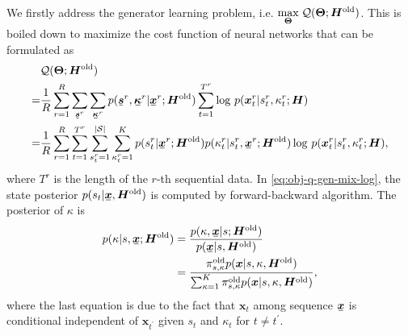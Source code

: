We firstly address the generator learning problem, i.e. $\underset{\bm{\Theta}}{\max}\; \mathcal{Q}(\bm{\Theta}; \bm{H}^{\mathrm{old}})$. This is boiled down to maximize the cost function of neural networks that can be formulated as
\begin{align}\label{eq:obj-q-gen-mix-log}
  &\Qq(\bm{\Theta}; \bm{H}^{\mathrm{old}}) \nonumber \\
  = &\frac{1}{R}\sum_{r=1}^{R}\sum_{\ubmr{s}{r}}\sum_{\ubmr{\kappa}{r}}{p(\ubmr{s}{r}, \ubmr{\kappa}{r}| \ubmr{x}{r}; \bm{H}^{\mathrm{old}})} \sum_{t=1}^{{T}^{r}}\log\,p(\bmtr{x}{t}{r} | \smtr{s}{t}{r}, \smtr{\kappa}{t}{r}; \bm{H}) \nonumber \\
  =& \frac{1}{R}\sum_{r=1}^{R} \sum_{t=1}^{{T}^{r}} \sum_{\smtr{s}{t}{r}=1}^{|\Ss|}  \sum_{\smtr{\kappa}{t}{r}=1}^{K}p(\smtr{s}{t}{r}| \ubmr{x}{r}; \bm{H}^{\mathrm{old}})p(\smtr{\kappa}{t}{r}|\smtr{s}{t}{r}, \ubmr{x}{r}; \bm{H}^{\mathrm{old}})  \log\, p(\bmtr{x}{t}{r} | \smtr{s}{t}{r}, \smtr{\kappa}{t}{r}; \bm{H}), 
\end{align}
where $T^r$ is the length of the $r$-th sequential data. In \eqref{eq:obj-q-gen-mix-log}, the state posterior $p(s_t| \ubm{x}, \bm{H}^{\mathrm{old}})$ is computed by forward-backward algorithm. The posterior of $\kappa$ is
\begin{align}\label{eq:kappa-posterior}
  p(\kappa| s, \ubm{x}; \bm{H}^{\mathrm{old}})
  &=  \frac{p(\kappa, \ubm{x}| s; \bm{H}^{\mathrm{old}})}{p(\ubm{x}| s,\bm{H}^{\mathrm{old}})} \nonumber \\
  & = \frac{\pi_{s, \kappa}^{\mathrm{old}} p(\bm{x}| s, \kappa, \bm{H}^{\mathrm{old}})}{\sum_{\kappa=1}^{K}  \pi_{s, \kappa}^{\mathrm{old}} p(\bm{x}| s, \kappa,\bm{H}^{\mathrm{old}})},
\end{align}
where the last equation is due to the fact that $\bm{x}_t$ among sequence $\ubm{x}$ is conditional independent of $\bm{x}_{t^{\prime}}$ given $s_t$ and $\kappa_t$ for $t\neq t^{\prime}$. 

